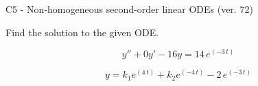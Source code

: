 \begin{exercise}
  \begin{exerciseTitle}C5 - Non-homogeneous second-order linear ODEs (ver. 72)\end{exerciseTitle}
  \begin{exerciseStatement}
    
Find the solution to the given ODE.

    
\[y''+0y'-16y = 14 \, e^{\left(-3 \, t\right)}\]

  \end{exerciseStatement}
  \begin{exerciseAnswer}
    
\[y= k_{1} e^{\left(4 \, t\right)} + k_{2} e^{\left(-4 \, t\right)} - 2 \, e^{\left(-3 \, t\right)}\]

  \end{exerciseAnswer}
\end{exercise}